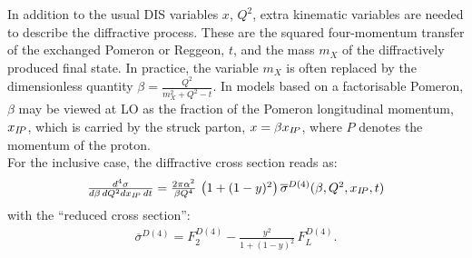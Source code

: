 In addition to the usual DIS variables $x$, $Q^2$, extra kinematic variables are needed to describe the diffractive process. 
These are the squared four-momentum transfer of the exchanged Pomeron or Reggeon, $t$, and 
the mass $m_X$ of the diffractively produced final state. 
In practice, the variable $m_X$ 
is often replaced by the dimensionless quantity $\beta=\frac{Q^2}{m_X^2+Q^2-t}$.
In models based on a factorisable Pomeron, $\beta$ may be viewed at LO as the fraction of the
Pomeron longitudinal momentum, $x_{{I\!P}}$, which is carried by the struck parton, $x=\beta x_{{I\!P}}$,
where $P$ denotes the momentum of the proton.
\\
For the inclusive case, the diffractive cross section reads as:
\begin{equation}
\begin{array}{lcl}
    \frac{d^4\sigma}{d\beta\,dQ^2dx_{{I\!P}}\,dt}
=
  \frac{2\pi\alpha^2}{\beta Q^4}\,
    \left( 1 +  (1-y)^2 \right) \overline\sigma^{D(4)}(\beta,Q^2,x_{{I\!P}},t)
\label{Dxs}
\end{array}
\end{equation}
with the ``reduced cross section'': 
\begin{equation}
\begin{array}{lcl}
\overline\sigma^{D(4)}
 = F_2^{D(4)} - \frac{y^2}{1 +  (1-y)^2}\, F_L^{D(4)}.
\label{eq:sigred}
\end{array}
\end{equation}

